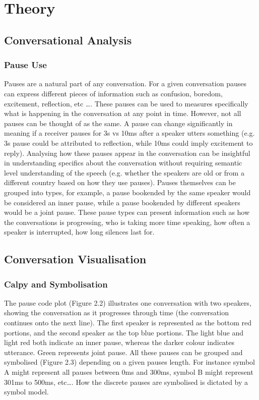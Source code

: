\chapter{Theory}
\section{Conversational Analysis}
\subsection{Pause Use}
Pauses are a natural part of any conversation. For a given conversation pauses can express different pieces of information such as confusion, boredom, excitement, reflection, etc \ldots. These pauses can be used to measures specifically what is happening in the conversation at any point in time. However, not all pauses can be thought of as the same. A pause can change significantly in meaning if a receiver pauses for 3s vs 10ms after a speaker utters something (e.g. 3s pause could be attributed to reflection, while 10ms could imply excitement to reply). Analysing how these pauses appear in the conversation can be insightful in understanding specifics about the conversation without requiring semantic level understanding of the speech (e.g. whether the speakers are old or from a different country based on how they use pauses). Pauses themselves can be grouped into types, for example, a pause bookended by the same speaker would be considered an inner pause, while a pause bookended by different speakers would be a joint pause. These pause types can present information such as how the conversations is progressing, who is taking more time speaking, how often a speaker is interrupted, how long silences last for.



\section{Conversation Visualisation}
\subsection{Calpy and Symbolisation}
The pause code plot (Figure 2.2) illustrates one conversation with two speakers, showing the conversation as it progresses through time (the conversation continues onto the next line). The first speaker is represented as the bottom red portions, and the second speaker as the top blue portions. The light blue and light red both indicate an inner pause, whereas the darker colour indicates utterance. Green represents joint pause. All these pauses can be grouped and symbolised (Figure 2.3) depending on a given pauses length. For instance symbol A might represent all pauses between 0ms and 300ms, symbol B might represent 301ms to 500ms, etc\ldots. How the discrete pauses are symbolised is dictated by a symbol model. \\

